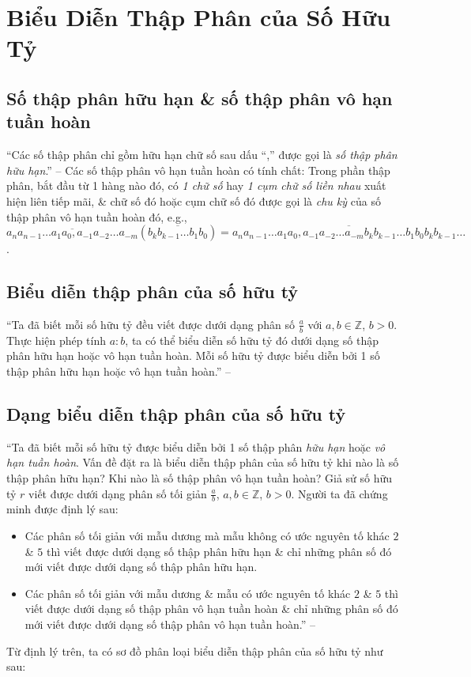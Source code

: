 \documentclass[oneside]{book}
\numberwithin{equation}{section}
\begin{document}
\section{Biểu Diễn Thập Phân của Số Hữu Tỷ}

\subsection{Số thập phân hữu hạn \& số thập phân vô hạn tuần hoàn}
``Các số thập phân chỉ gồm hữu hạn chữ số sau dấu ``,'' được gọi là \textit{số thập phân hữu hạn}.'' -- \cite[p. 27]{SGK_Toan_7_Canh_Dieu_tap_1} Các số thập phân vô hạn tuần hoàn có tính chất: Trong phần thập phân, bắt đầu từ 1 hàng nào đó, có \textit{1 chữ số} hay \textit{1 cụm chữ số liền nhau} xuất hiện liên tiếp mãi, \& chữ số đó hoặc cụm chữ số đó được gọi là \textit{chu kỳ} của số thập phân vô hạn tuần hoàn đó, e.g., $\overline{a_na_{n-1}\ldots a_1a_0,a_{-1}a_{-2}\ldots a_{-m}}(\overline{b_kb_{k-1}\ldots b_1b_0}) = \overline{a_na_{n-1}\ldots a_1a_0,a_{-1}a_{-2}\ldots a_{-m}b_kb_{k-1}\ldots b_1b_0b_kb_{k-1}\ldots}$.

\subsection{Biểu diễn thập phân của số hữu tỷ}
``Ta đã biết mỗi số hữu tỷ đều viết được dưới dạng phân số $\frac{a}{b}$ với $a,b\in\mathbb{Z}$, $b > 0$. Thực hiện phép tính $a:b$, ta có thể biểu diễn số hữu tỷ đó dưới dạng số thập phân hữu hạn hoặc vô hạn tuần hoàn. Mỗi số hữu tỷ được biểu diễn bởi 1 số thập phân hữu hạn hoặc vô hạn tuần hoàn.'' -- \cite[p. 28]{SGK_Toan_7_Canh_Dieu_tap_1}

\subsection{Dạng biểu diễn thập phân của số hữu tỷ}
``Ta đã biết mỗi số hữu tỷ được biểu diễn bởi 1 số thập phân \textit{hữu hạn} hoặc \textit{vô hạn tuần hoàn}. Vấn đề đặt ra là biểu diễn thập phân của số hữu tỷ khi nào là số thập phân hữu hạn? Khi nào là số thập phân vô hạn tuần hoàn? Giả sử số hữu tỷ $r$ viết được dưới dạng phân số tối giản $\frac{a}{b}$, $a,b\in\mathbb{Z}$, $b> 0$. Người ta đã chứng minh được định lý sau:
\begin{itemize}
	\item Các phân số tối giản với mẫu dương mà mẫu không có ước nguyên tố khác $2$ \& $5$ thì viết được dưới dạng số thập phân hữu hạn \& chỉ những phân số đó mới viết được dưới dạng số thập phân hữu hạn.
	\item Các phân số tối giản với mẫu dương \& mẫu có ước nguyên tố khác $2$ \& $5$ thì viết được dưới dạng số thập phân vô hạn tuần hoàn \& chỉ những phân số đó mới viết được dưới dạng số thập phân vô hạn tuần hoàn.'' -- \cite[p. 29]{SGK_Toan_7_Canh_Dieu_tap_1}
\end{itemize}
Từ định lý trên, ta có sơ đồ phân loại biểu diễn thập phân của số hữu tỷ như sau:
\end{document}
